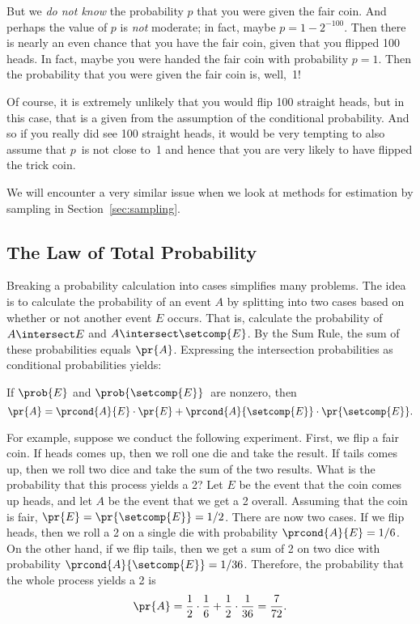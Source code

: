 But we \emph{do not know} the probability $p$ that you were given
the fair coin.  And perhaps the value of $p$ is \emph{not} moderate;
in fact, maybe $p = 1 - 2^{-100}$.  Then there is nearly an even
chance that you have the fair coin, given that you flipped 100 heads.
In fact, maybe you were handed the fair coin with probability $p = 1$.
Then the probability that you were given the fair coin is, well,~1!

Of course, it is extremely unlikely that you would flip 100 straight
heads, but in this case, that is a given from the assumption of the
conditional probability.  And so if you really did see 100 straight
heads, it would be very tempting to also assume that $p$~is not close
to~1 and hence that you are very likely to have flipped the trick
coin.

We will encounter a very similar issue when we look at methods for
estimation by sampling in Section~\ref{sec:sampling}.
\fi


\subsection{The Law of Total Probability}\label{sec:total_probability}

Breaking a probability calculation into cases simplifies many
problems.  The idea is to calculate the probability of an event $A$ by
splitting into two cases based on whether or not another event $E$
occurs.  That is, calculate the probability of $A\nobreak
\intersect\nobreak E$ and $A \intersect \setcomp{E}$.  By the Sum
Rule, the sum of these probabilities equals $\pr{A}$.  Expressing the
intersection probabilities as conditional probabilities yields:
\begin{rul}\label{total_prob_Ebar}
If $\prob{E}$ and $\prob{\setcomp{E}}$~are nonzero, then
\[
\pr{A} = \prcond{A}{E} \cdot \pr{E} +
         \prcond{A}{\setcomp{E}} \cdot \pr{\setcomp{E}}.
\]
\end{rul}

For example, suppose we conduct the following experiment.  First, we
flip a fair coin.  If heads comes up, then we roll one die and take the
result.  If tails comes up, then we roll two dice and take the sum of
the two results.  What is the probability that this process yields a
2?  Let $E$ be the event that the coin comes up heads, and let $A$ be
the event that we get a 2 overall.  Assuming that the coin is fair,
$\pr{E} = \pr{\setcomp{E}} = 1/2$.  There are now two cases. If we
flip heads, then we roll a 2 on a single die with probability
$\prcond{A}{E} = 1/6$.  On the other hand, if we flip tails, then we
get a sum of 2 on two dice with probability
$\prcond{A}{\setcomp{E}} = 1/36$.  Therefore, the probability that
the whole process yields a 2 is
\[
\pr{A} = \frac{1}{2} \cdot \frac{1}{6} + \frac{1}{2} \cdot \frac{1}{36} =
  \frac{7}{72}.
\]

